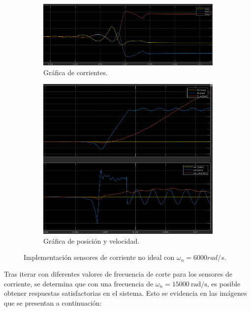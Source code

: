 \documentclass{article}
\begin{document}
\begin{figure}[H]
    \centering
    \begin{subfigure}[t]{0.5\textwidth}
        \centering
        \includegraphics[width=\textwidth]{Imagenes/7_corNI_6000_c.png}
        \caption{Gráfica de corrientes.}
    \end{subfigure}
    \begin{subfigure}[t]{0.5\textwidth}
        \centering
        \includegraphics[width=\textwidth]{Imagenes/8_corNI_6000_pw.png}
        \caption{Gráfica de posición y velocidad.}
    \end{subfigure}
    \caption{Implementación sensores de corriente no ideal con $\omega_n = 6000 rad/s$.}
\end{figure}

Tras iterar con diferentes valores de frecuencia de corte para los sensores de corriente, se determina que con una frecuencia de $\omega_n = 15000 \ \text{rad/s}$, es posible obtener respuestas satisfactorias en el sistema. Esto se evidencia en las imágenes que se presentan a continuación:
\end{document}

